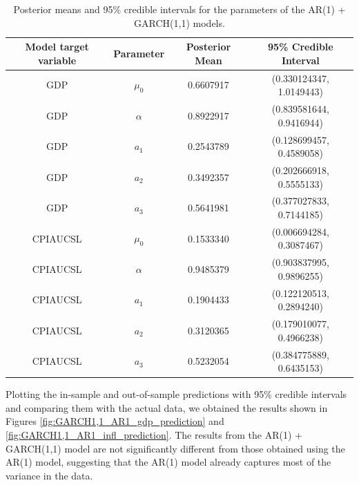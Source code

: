 \begin{table}[H]
    \centering
    \begin{tabular}{|c|c|c|c|}
        \hline
        \textbf{Model target variable } & \textbf{Parameter } & \textbf{Posterior Mean } & \textbf{95\% Credible Interval } \\
        \hline
        GDP      & $\mu_0$  & 0.6607917 & (0.330124347, 1.0149443) \\
        GDP      & $\alpha$ & 0.8922917 & (0.839581644, 0.9416944) \\
        GDP      & $a_1$    & 0.2543789 & (0.128699457, 0.4589058) \\
        GDP      & $a_2$    & 0.3492357 & (0.202666918, 0.5555133) \\
        GDP      & $a_3$    & 0.5641981 & (0.377027833, 0.7144185) \\
        CPIAUCSL & $\mu_0$  & 0.1533340 & (0.006694284, 0.3087467) \\
        CPIAUCSL & $\alpha$ & 0.9485379 & (0.903837995, 0.9896255) \\
        CPIAUCSL & $a_1$    & 0.1904433 & (0.122120513, 0.2894240) \\
        CPIAUCSL & $a_2$    & 0.3120365 & (0.179010077, 0.4966238) \\
        CPIAUCSL & $a_3$    & 0.5232054 & (0.384775889, 0.6435153) \\
        \hline
    \end{tabular}
    \caption{Posterior means and 95\% credible intervals for the parameters of the AR(1) + GARCH(1,1) models.}
    \label{tab:GARCH1,1_AR1_posteriors}
\end{table}
Plotting the in-sample and out-of-sample predictions with 95\% credible intervals and comparing them with the actual data, we obtained the results shown in Figures \ref{fig:GARCH1,1_AR1_gdp_prediction} and \ref{fig:GARCH1,1_AR1_infl_prediction}. The results from the AR(1) + GARCH(1,1) model are not significantly different from those obtained using the AR(1) model, suggesting that the AR(1) model already captures most of the variance in the data. \\
